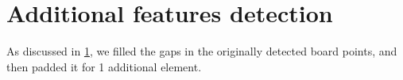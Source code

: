 
\section{Additional features detection}\label{sec:additional_features_detection}

As discussed in \cref{sec:additional_features_detection}, we filled the gaps in
the originally detected board points, and then padded it for 1 additional
element.

